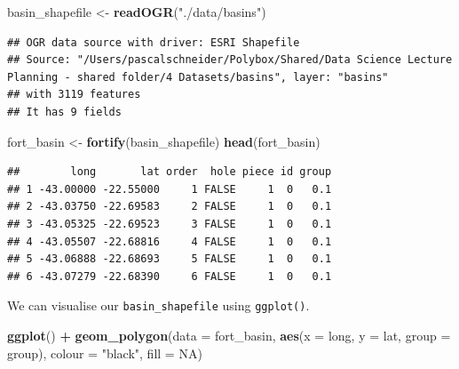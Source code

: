 \documentclass[
]{book}
\newenvironment{Shaded}{\begin{snugshade}}{\end{snugshade}}
\newcommand{\DataTypeTok}[1]{\textcolor[rgb]{0.13,0.29,0.53}{#1}}
\newcommand{\KeywordTok}[1]{\textcolor[rgb]{0.13,0.29,0.53}{\textbf{#1}}}
\newcommand{\NormalTok}[1]{#1}
\newcommand{\OperatorTok}[1]{\textcolor[rgb]{0.81,0.36,0.00}{\textbf{#1}}}
\newcommand{\OtherTok}[1]{\textcolor[rgb]{0.56,0.35,0.01}{#1}}
\newcommand{\StringTok}[1]{\textcolor[rgb]{0.31,0.60,0.02}{#1}}
\begin{document}
\begin{Shaded}
\begin{Highlighting}[]
\NormalTok{basin_shapefile <-}\StringTok{ }\KeywordTok{readOGR}\NormalTok{(}\StringTok{"./data/basins"}\NormalTok{)}
\end{Highlighting}
\end{Shaded}

\begin{verbatim}
## OGR data source with driver: ESRI Shapefile 
## Source: "/Users/pascalschneider/Polybox/Shared/Data Science Lecture Planning - shared folder/4 Datasets/basins", layer: "basins"
## with 3119 features
## It has 9 fields
\end{verbatim}

\begin{Shaded}
\begin{Highlighting}[]
\NormalTok{fort_basin <-}\StringTok{ }\KeywordTok{fortify}\NormalTok{(basin_shapefile)}
\KeywordTok{head}\NormalTok{(fort_basin)}
\end{Highlighting}
\end{Shaded}

\begin{verbatim}
##        long       lat order  hole piece id group
## 1 -43.00000 -22.55000     1 FALSE     1  0   0.1
## 2 -43.03750 -22.69583     2 FALSE     1  0   0.1
## 3 -43.05325 -22.69523     3 FALSE     1  0   0.1
## 4 -43.05507 -22.68816     4 FALSE     1  0   0.1
## 5 -43.06888 -22.68693     5 FALSE     1  0   0.1
## 6 -43.07279 -22.68390     6 FALSE     1  0   0.1
\end{verbatim}

We can visualise our \texttt{basin\_shapefile} using \texttt{ggplot()}.

\begin{Shaded}
\begin{Highlighting}[]
\KeywordTok{ggplot}\NormalTok{() }\OperatorTok{+}\StringTok{ }\KeywordTok{geom_polygon}\NormalTok{(}\DataTypeTok{data =}\NormalTok{ fort_basin, }\KeywordTok{aes}\NormalTok{(}\DataTypeTok{x =}\NormalTok{ long, }\DataTypeTok{y =}\NormalTok{ lat, }\DataTypeTok{group =}\NormalTok{ group), }\DataTypeTok{colour =} \StringTok{"black"}\NormalTok{, }\DataTypeTok{fill =} \OtherTok{NA}\NormalTok{)}
\end{Highlighting}
\end{Shaded}
\end{document}
